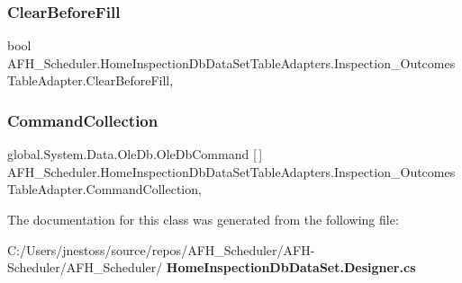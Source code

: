 \subsubsection{ClearBeforeFill}
{\footnotesize\ttfamily bool A\+F\+H\+\_\+\+Scheduler.\+Home\+Inspection\+Db\+Data\+Set\+Table\+Adapters.\+Inspection\+\_\+\+Outcomes\+Table\+Adapter.\+Clear\+Before\+Fill\hspace{0.3cm}{\ttfamily [get]}, {\ttfamily [set]}}

\mbox{\label{class_a_f_h___scheduler_1_1_home_inspection_db_data_set_table_adapters_1_1_inspection___outcomes_table_adapter_adbfe26929e9e6d9c7c768b51273dd149}} 
\subsubsection{CommandCollection}
{\footnotesize\ttfamily global.\+System.\+Data.\+Ole\+Db.\+Ole\+Db\+Command [$\,$] A\+F\+H\+\_\+\+Scheduler.\+Home\+Inspection\+Db\+Data\+Set\+Table\+Adapters.\+Inspection\+\_\+\+Outcomes\+Table\+Adapter.\+Command\+Collection\hspace{0.3cm}{\ttfamily [get]}, {\ttfamily [protected]}}



The documentation for this class was generated from the following file\+:\begin{DoxyCompactItemize}
\item 
C\+:/\+Users/jnestoss/source/repos/\+A\+F\+H\+\_\+\+Scheduler/\+A\+F\+H-\/\+Scheduler/\+A\+F\+H\+\_\+\+Scheduler/\textbf{ Home\+Inspection\+Db\+Data\+Set.\+Designer.\+cs}\end{DoxyCompactItemize}
